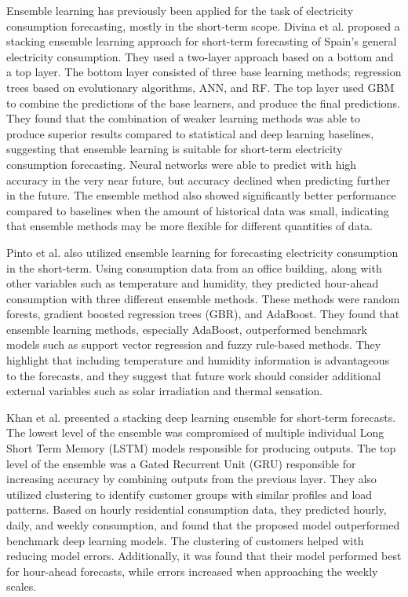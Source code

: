 Ensemble learning has previously been applied for the task of electricity consumption forecasting, mostly in the short-term scope. Divina et al. \cite{divina_stacking_2018} proposed a stacking ensemble learning approach for short-term  forecasting of Spain's general electricity consumption. They used a two-layer approach based on a bottom and a top layer. The bottom layer consisted of three base learning methods; regression trees based on evolutionary algorithms, ANN, and RF. The top layer used GBM to combine the predictions of the base learners, and produce the final predictions. They found that the combination of weaker learning methods was able to produce superior results compared to statistical and deep learning baselines, suggesting that ensemble learning is suitable for short-term electricity consumption forecasting. Neural networks were able to predict with high accuracy in the very near future, but accuracy declined when predicting further in the future. The ensemble method also showed significantly better performance compared to baselines when the amount of historical data was small, indicating that ensemble methods may be more flexible for different quantities of data.

Pinto et al. \cite{pinto_ensemble_2021} also utilized ensemble learning for forecasting electricity consumption in the short-term. Using consumption data from an office building, along with other variables such as temperature and humidity, they predicted hour-ahead consumption with three different ensemble methods. These methods were random forests, gradient boosted regression trees (GBR), and AdaBoost. They found that ensemble learning methods, especially AdaBoost, outperformed benchmark models such as support vector regression and fuzzy rule-based methods. They highlight that including temperature and humidity information is advantageous to the forecasts, and they suggest that future work should consider additional external variables such as solar irradiation and thermal sensation.

Khan et al. \cite{khan_ensemble_2021} presented a stacking deep learning ensemble for short-term forecasts. The lowest level of the ensemble was compromised of multiple individual Long Short Term Memory (LSTM) models responsible for producing outputs. The top level of the ensemble was a Gated Recurrent Unit (GRU) responsible for increasing accuracy by combining outputs from the previous layer. They also utilized clustering to identify customer groups with similar profiles and load patterns. Based on hourly residential consumption data, they predicted hourly, daily, and weekly consumption, and found that the proposed model outperformed benchmark deep learning models. The clustering of customers helped with reducing model errors. Additionally, it was found that their model performed best for hour-ahead forecasts, while errors increased when approaching the weekly scales.

